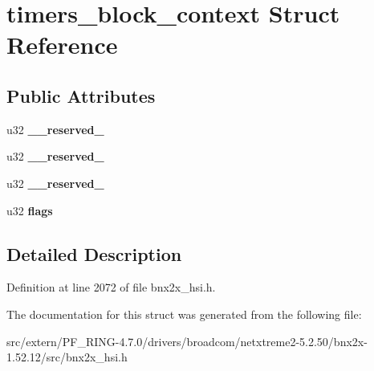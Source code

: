 \hypertarget{structtimers__block__context}{
\section{timers\_\-block\_\-context Struct Reference}
\label{structtimers__block__context}
}
\subsection*{Public Attributes}
\begin{DoxyCompactItemize}
\item 
\hypertarget{structtimers__block__context_a090b5a7ce90953dafd963cc290f36725}{
u32 {\bfseries \_\-\_\-reserved\_}}
\label{structtimers__block__context_a090b5a7ce90953dafd963cc290f36725}

\item 
\hypertarget{structtimers__block__context_a15213e2bb587c778dafd621e5eabf4ad}{
u32 {\bfseries \_\-\_\-reserved\_}}
\label{structtimers__block__context_a15213e2bb587c778dafd621e5eabf4ad}

\item 
\hypertarget{structtimers__block__context_a6e0e91e82867079464e8c2fbda4d8047}{
u32 {\bfseries \_\-\_\-reserved\_}}
\label{structtimers__block__context_a6e0e91e82867079464e8c2fbda4d8047}

\item 
\hypertarget{structtimers__block__context_ad6579ea8e8a94a09917c96c48864525c}{
u32 {\bfseries flags}}
\label{structtimers__block__context_ad6579ea8e8a94a09917c96c48864525c}

\end{DoxyCompactItemize}


\subsection{Detailed Description}


Definition at line 2072 of file bnx2x\_\-hsi.h.



The documentation for this struct was generated from the following file:\begin{DoxyCompactItemize}
\item 
src/extern/PF\_\-RING-\/4.7.0/drivers/broadcom/netxtreme2-\/5.2.50/bnx2x-\/1.52.12/src/bnx2x\_\-hsi.h\end{DoxyCompactItemize}
